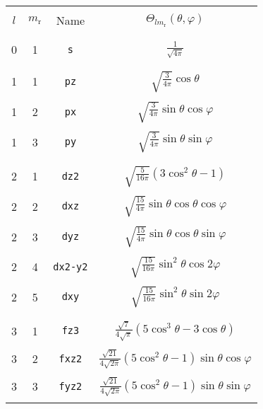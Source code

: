 \begin{table}
\begin{center}
\begin{tabular}{|cccc|}
\hline\hline
&&&\\
$l$ & $m_{\mathrm{r}}$ & Name & $\Theta_{lm_{\mathrm{r}}}(\theta,\varphi)$ \\ 
&&&\\\hline&&&\\
 0  &  1  &  \verb#s#   & $\frac{1}{\sqrt{4\pi}}$ \\ 
&&&\\\hline&&&\\
 1  &  1  &  \verb#pz#  & $\sqrt{\frac{3}{4\pi}}\cos\theta$ \\
&&&\\
 1  &  2  &  \verb#px#  & $\sqrt{\frac{3}{4\pi}}\sin\theta\cos\varphi$ \\
&&&\\
 1  &  3  &  \verb#py#  & $\sqrt{\frac{3}{4\pi}}\sin\theta\sin\varphi$ \\ 
&&&\\\hline&&&\\
 2  &  1  &  \verb#dz2# &
$\sqrt{\frac{5}{16\pi}}(3\cos^{2}\theta -1)$ \\
&&&\\
 2  &  2  &  \verb#dxz# &
$\sqrt{\frac{15}{4\pi}}\sin\theta\cos\theta\cos\varphi$ \\
&&&\\
 2  &  3  &  \verb#dyz# &
$\sqrt{\frac{15}{4\pi}}\sin\theta\cos\theta\sin\varphi$ \\
&&&\\
 2  &  4  &  \verb#dx2-y2# &
$\sqrt{\frac{15}{16\pi}}\sin^{2}\theta\cos2\varphi$ \\
&&&\\
 2  &  5  &  \verb#dxy# &
$\sqrt{\frac{15}{16\pi}}\sin^{2}\theta\sin2\varphi$ \\
&&&\\\hline&&&\\
 3  &  1  &  \verb#fz3# & 
$\frac{\sqrt{7}}{4\sqrt{\pi}}(5\cos^{3}\theta-3\cos\theta)$ \\
&&&\\
 3  &  2  &  \verb#fxz2# & 
$\frac{\sqrt{21}}{4\sqrt{2\pi}}(5\cos^{2}\theta-1)\sin\theta\cos\varphi$\\
&&&\\
 3  &  3  &  \verb#fyz2# & 
$\frac{\sqrt{21}}{4\sqrt{2\pi}}(5\cos^{2}\theta-1)\sin\theta\sin\varphi$\\
&&&\\

\end{tabular}
\end{center}
\end{table}
